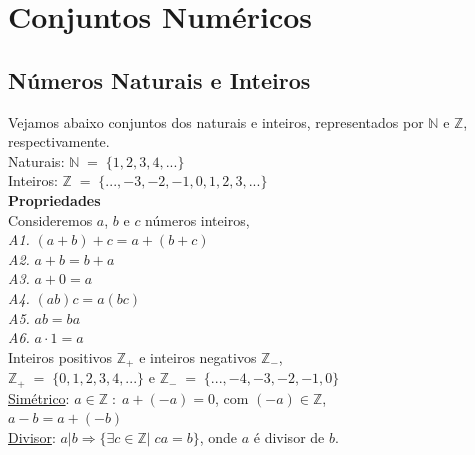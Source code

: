 \section{Conjuntos Numéricos}
\subsection{Números Naturais e Inteiros}
Vejamos abaixo conjuntos dos naturais e inteiros, representados por $\mathbb{N}$ e $\mathbb{Z}$, respectivamente.\\

\text{\textbullet} Naturais: $\mathbb{N} \; = \; \{ 1,2,3,4, ... \} $ \\

\text{\textbullet} Inteiros: $ \mathbb{Z} \; = \; \{ ..., -3, -2, -1, 0, 1, 2, 3, ... \}$ \\

\noindent
\textbf{Propriedades} \\


\noindent
Consideremos $a$, $b$ e $c$ números inteiros, \\
\noindent
\emph{A1.} $ (a + b) + c = a + (b + c)$ \\
\emph{A2.} $ a + b = b + a $ \\
\emph{A3.} $ a + 0 = a $ \\
\emph{A4.} $ (ab)c = a(bc) $ \\
\emph{A5.} $ ab = ba $ \\
\emph{A6.} $ a \cdot 1 = a $ \\

\noindent
Inteiros positivos $\mathbb{Z_+}$ e inteiros negativos $ \mathbb{Z_{-}}$,\\

\noindent
$ \mathbb{Z_+} \; = \; \{ 0, 1, 2, 3, 4, ... \} $ e $ \mathbb{Z_{-}} \; = \; \{ ..., -4, -3, -2, -1, 0 \} $ \\

\noindent
\underline{Simétrico}: $ a \in \mathbb{Z} \; : \; a + (- a) = 0$, com $(-a) \in \mathbb{Z} $, \\
$ a - b = a + (-b) $ \\

\noindent
\underline{Divisor}: $a|b \Rightarrow \{ \exists c \in \mathbb{Z} | \; ca=b \}$, onde $a$ é divisor de $b$. \\ \\


